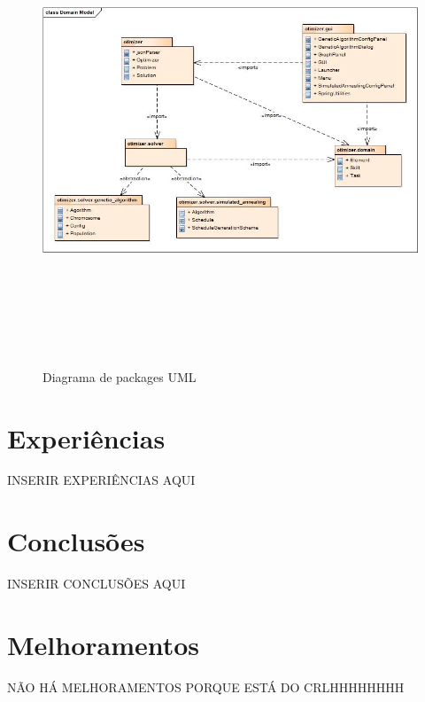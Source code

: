 \begin{titlepage}
\begin{figure}[H]
  \centering
    \includegraphics[width=18cm, height = 14cm]{packageDiagram.jpg}
  \caption{Diagrama de packages UML}
  \label{packageD}
\end{figure}

\section{Experiências}

INSERIR EXPERIÊNCIAS AQUI

\section{Conclusões}
\justify\normalsize

INSERIR CONCLUSÕES AQUI

\section{Melhoramentos}
\justify\normalsize

NÃO HÁ MELHORAMENTOS PORQUE ESTÁ DO CRLHHHHHHHH

\nocite{*}



\end{titlepage}
